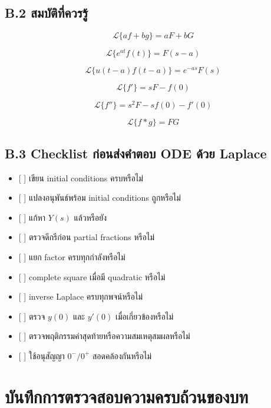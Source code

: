 \subsection{B.2 สมบัติที่ควรรู้}

\[
\mathcal{L}\{af+bg\}=aF+bG
\]

\[
\mathcal{L}\{e^{at}f(t)\}=F(s-a)
\]

\[
\mathcal{L}\{u(t-a)f(t-a)\}=e^{-as}F(s)
\]

\[
\mathcal{L}\{f'\}=sF-f(0)
\]

\[
\mathcal{L}\{f''\}=s^2F-sf(0)-f'(0)
\]

\[
\mathcal{L}\{f*g\}=FG
\]

\subsection{B.3 Checklist ก่อนส่งคำตอบ ODE ด้วย Laplace}

\begin{itemize}
    \item {[ ]} เขียน initial conditions ครบหรือไม่
    \item {[ ]} แปลงอนุพันธ์พร้อม initial conditions ถูกหรือไม่
    \item {[ ]} แก้หา $Y(s)$ แล้วหรือยัง
    \item {[ ]} ตรวจดีกรีก่อน partial fractions หรือไม่
    \item {[ ]} แยก factor ครบทุกกำลังหรือไม่
    \item {[ ]} complete square เมื่อมี quadratic หรือไม่
    \item {[ ]} inverse Laplace ครบทุกพจน์หรือไม่
    \item {[ ]} ตรวจ $y(0)$ และ $y'(0)$ เมื่อเกี่ยวข้องหรือไม่
    \item {[ ]} ตรวจพฤติกรรมค่าสุดท้ายหรือความสมเหตุสมผลหรือไม่
    \item {[ ]} ใช้อนุสัญญา $0^-/0^+$ สอดคล้องกันหรือไม่
\end{itemize}



\section{บันทึกการตรวจสอบความครบถ้วนของบท}

